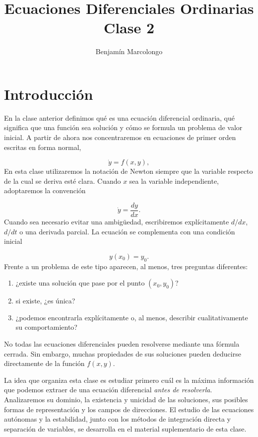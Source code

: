 \documentclass[12pt,a4paper]{article}
\title{Ecuaciones Diferenciales Ordinarias\\Clase 2}
\author{Benjamín Marcolongo}
\date{}
\begin{document}
	\maketitle

	\section{Introducción}

	En la clase anterior definimos qué es una ecuación diferencial ordinaria, qué significa que una función sea solución y cómo se formula un problema de valor inicial. A partir de ahora nos concentraremos en ecuaciones de primer orden escritas en forma normal,

	\[
	\dot{y}=f(x,y),
	\]
En esta clase utilizaremos la notación de Newton siempre que la variable respecto de la cual se deriva esté clara. Cuando \(x\) sea la variable independiente, adoptaremos la convención

	\[
	\dot{y}=\frac{dy}{dx}.
	\]
Cuando sea necesario evitar una ambigüedad, escribiremos explícitamente \(d/dx\), \(d/dt\) o una derivada parcial. La ecuación se complementa con una condición inicial

	\[
	y(x_0)=y_0.
	\]
Frente a un problema de este tipo aparecen, al menos, tres preguntas diferentes:

	\begin{enumerate}[label=\arabic*.]
		\item ¿existe una solución que pase por el punto \((x_0,y_0)\)?
		\item si existe, ¿es única?
		\item ¿podemos encontrarla explícitamente o, al menos, describir cualitativamente su comportamiento?
	\end{enumerate}

	No todas las ecuaciones diferenciales pueden resolverse mediante una fórmula cerrada. Sin embargo, muchas propiedades de sus soluciones pueden deducirse directamente de la función \(f(x,y)\).

	La idea que organiza esta clase es estudiar primero cuál es la máxima información que podemos extraer de una ecuación diferencial \emph{antes de resolverla}. Analizaremos su dominio, la existencia y unicidad de las soluciones, sus posibles formas de representación y los campos de direcciones. El estudio de las ecuaciones autónomas y la estabilidad, junto con los métodos de integración directa y separación de variables, se desarrolla en el material suplementario de esta clase.
\end{document}
